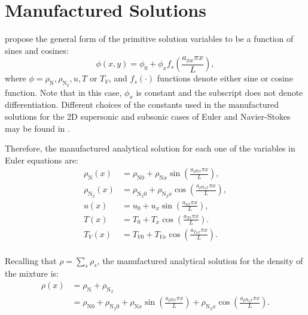 \documentclass[10pt]{article}
\begin{document}
\section{Manufactured Solutions}

\citet{Roy2002} propose the general form of the primitive solution variables to be a function of sines and cosines:
\begin{equation}
 \label{eq:manufactured01}
 \phi (x,y) = \phi_0+ \phi_x f_s\left(\frac{a_{\phi x} \pi x}{L}\right) ,
\end{equation}
where $\phi=\rho_{\text{N}},\rho_{\text{N}_2}, u, T$ or $T_V$, and $f_s(\cdot)$ functions denote either sine or cosine function. Note that in this case, $\phi_x$ is constant and the subscript does not denote differentiation. Different choices of the constants used in the manufactured solutions for the 2D supersonic and subsonic cases of Euler and Navier-Stokes may be found in \citet{Roy2002}.

Therefore, the manufactured analytical solution for each one of the variables in Euler equations are:
\begin{equation}
\begin{split}
\label{eq:manufactured02}
\rho_{\text{N}}(x) &= \rho_{\text{N}0} + \rho_{\text{N}x} \sin\left(\frac{a_{  \rho \text{N} x }\pi x}{L}\right),\\
\rho_{\text{N}_2}(x) &= \rho_{\text{N}_2 0}+ \rho_{\text{N}_2 x} \cos\left(\frac{a_{ \rho \text{N}_2 x } \pi x}{L}\right),\\
u(x) &= u_{0}+u_{x} \sin\left(\frac{a_{u x} \pi x}{L}\right),\\
T(x) &= T_{0}+T_{x} \cos\left(\frac{a_{T x} \pi x}{L}\right).\\
T_V(x) &= T_{V0}+T_{Vx} \cos\left(\frac{a_{T_V x} \pi x}{L}\right).\\
\end{split}
\end{equation}

Recalling that $\rho=\sum_s \rho_s$, the manufactured analytical solution for the density of the mixture  is:
\begin{equation}
\label{eq:manufactured03}
\begin{split}
\rho(x) &= \rho_{\text{N}}+\rho_{\text{N}_2}\\
                     &= \rho_{\text{N}0} + \rho_{\text{N}_2 0} +
\rho_{\text{N}x} \sin\left(\frac{a_{  \rho \text{N} x }\pi x}{L}\right) + \rho_{\text{N}_2 x} \cos\left(\frac{a_{ \rho \text{N}_2 x } \pi x}{L}\right) .
\end{split}
\end{equation}
\end{document}
